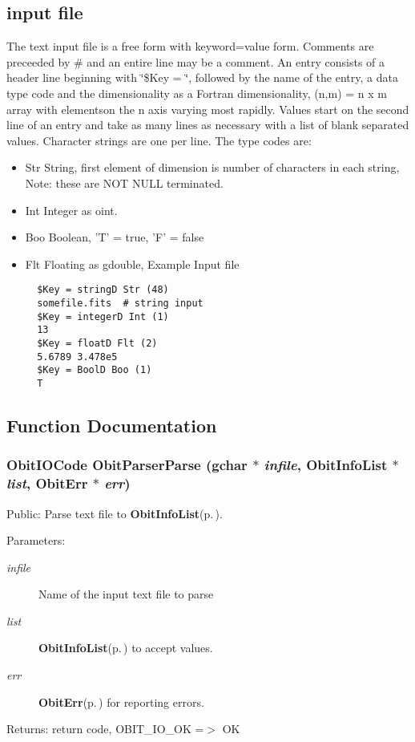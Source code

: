 \subsection{input file}\label{ObitParser_8h_input_file}
The text input file is a free form with keyword=value form. Comments are preceeded by \# and an entire line may be a comment. An entry consists of a header line beginning with \char`\"{}\$Key = \char`\"{}, followed by the name of the entry, a data type code and the dimensionality as a Fortran dimensionality, (n,m) = n x m array with elementson the n axis varying most rapidly. Values start on the second line of an entry and take as many lines as necessary with a list of blank separated values. Character strings are one per line. The type codes are: \begin{itemize}
\item Str String, first element of dimension is number of characters in each string, Note: these are NOT NULL terminated. \item Int Integer as oint. \item Boo Boolean, 'T' = true, 'F' = false \item Flt Floating as gdouble, Example Input file 

\footnotesize\begin{verbatim}
  $Key = stringD Str (48)
  somefile.fits  # string input
  $Key = integerD Int (1)
  13
  $Key = floatD Flt (2)
  5.6789 3.478e5
  $Key = BoolD Boo (1)
  T
 \end{verbatim}
\normalsize
\end{itemize}


\subsection{Function Documentation}
\subsubsection{\setlength{\rightskip}{0pt plus 5cm}Obit\-IOCode Obit\-Parser\-Parse (gchar $\ast$ {\em infile}, {\bf Obit\-Info\-List} $\ast$ {\em list}, {\bf Obit\-Err} $\ast$ {\em err})}\label{ObitParser_8h_a0}


Public: Parse text file to {\bf Obit\-Info\-List}{\rm (p.\,\pageref{structObitInfoList})}. 

\begin{Desc}
\item[Parameters:]
\begin{description}
\item[{\em infile}]Name of the input text file to parse \item[{\em list}]{\bf Obit\-Info\-List}{\rm (p.\,\pageref{structObitInfoList})} to accept values. \item[{\em err}]{\bf Obit\-Err}{\rm (p.\,\pageref{structObitErr})} for reporting errors. \end{description}
\end{Desc}
\begin{Desc}
\item[Returns:]return code, OBIT\_\-IO\_\-OK =$>$ OK \end{Desc}
